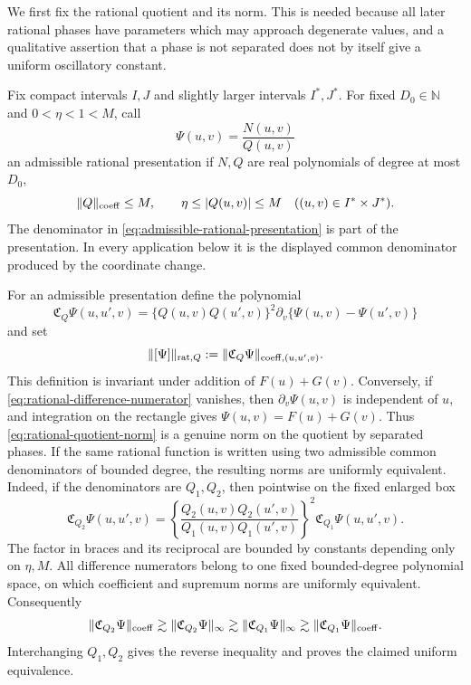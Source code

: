 \documentclass[11pt]{article}
\numberwithin{equation}{section}
\theoremstyle{remark}
\theoremstyle{definition}
\newcommand{\norm}[1]{\lVert #1\rVert}
\begin{document}
We first fix the rational quotient and its norm.  This is needed because
all later rational phases have parameters which may approach degenerate
values, and a qualitative assertion that a phase is not separated does not
by itself give a uniform oscillatory constant.

Fix compact intervals $I,J$ and slightly larger intervals $I^*,J^*$.
For fixed $D_0\in\mathbb N$ and $0<\eta<1<M$, call
\begin{equation}\label{eq:admissible-rational-presentation}
 \Psi(u,v)=\frac{N(u,v)}{Q(u,v)}
\end{equation}
an admissible rational presentation if $N,Q$ are real polynomials of degree
at most $D_0$,
\begin{equation}\label{eq:admissible-denominator}
 \norm Q_{\rm coeff}\le M,
 \qquad \eta\le |Q(u,v)|\le M
 \quad ((u,v)\in I^*\times J^*).
\end{equation}
The denominator in \eqref{eq:admissible-rational-presentation} is part of
the presentation.  In every application below it is the displayed common
denominator produced by the coordinate change.

For an admissible presentation define the polynomial
\begin{equation}\label{eq:rational-difference-numerator}
 \mathfrak C_Q\Psi(u,u',v)
 =\{Q(u,v)Q(u',v)\}^2
   \partial_v\{\Psi(u,v)-\Psi(u',v)\}
\end{equation}
and set
\begin{equation}\label{eq:rational-quotient-norm}
 \norm{[\Psi]}_{{\rm rat},Q}
 :=\norm{\mathfrak C_Q\Psi}_{\mathrm{coeff},(u,u',v)}.
\end{equation}
This definition is invariant under addition of $F(u)+G(v)$.  Conversely,
if \eqref{eq:rational-difference-numerator} vanishes, then
$\partial_v\Psi(u,v)$ is independent of $u$, and integration on the
rectangle gives $\Psi(u,v)=F(u)+G(v)$.  Thus
\eqref{eq:rational-quotient-norm} is a genuine norm on the quotient by
separated phases.  If the same rational function is written using two
admissible common denominators of bounded degree, the resulting norms are
uniformly equivalent.  Indeed, if the denominators are $Q_1,Q_2$, then
pointwise on the fixed enlarged box
\begin{equation}\label{eq:rational-denominator-change}
 \mathfrak C_{Q_2}\Psi(u,u',v)
 =\left\{\frac{Q_2(u,v)Q_2(u',v)}
 {Q_1(u,v)Q_1(u',v)}\right\}^{\!2}
 \mathfrak C_{Q_1}\Psi(u,u',v).
\end{equation}
The factor in braces and its reciprocal are bounded by constants depending
only on $\eta,M$.  All difference numerators belong to one fixed
bounded-degree polynomial space, on which coefficient and supremum norms
are uniformly equivalent.  Consequently
\[
 \norm{\mathfrak C_{Q_2}\Psi}_{\rm coeff}
 \gtrsim\norm{\mathfrak C_{Q_2}\Psi}_\infty
 \gtrsim\norm{\mathfrak C_{Q_1}\Psi}_\infty
 \gtrsim\norm{\mathfrak C_{Q_1}\Psi}_{\rm coeff}.
\]
Interchanging $Q_1,Q_2$ gives the reverse inequality and proves the
claimed uniform equivalence.
\end{document}

